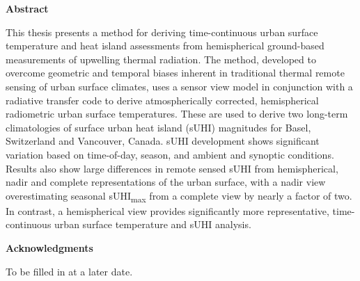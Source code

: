 \pagestyle{plain}
\setcounter{page}{2}

\cleardoublepage %



\begin{center}\textbf{Abstract}\end{center}

This thesis presents a method for deriving time-continuous urban surface temperature and heat island assessments from hemispherical ground-based measurements of upwelling thermal radiation. The method, developed to overcome geometric and temporal biases inherent in traditional thermal remote sensing of urban surface climates, uses a sensor view model in conjunction with a radiative transfer code to derive atmospherically corrected, hemispherical radiometric urban surface temperatures. These are used to derive two long-term climatologies of surface urban heat island (sUHI) magnitudes for Basel, Switzerland and Vancouver, Canada. sUHI development shows significant variation based on time-of-day, season, and ambient and synoptic conditions. Results also show large differences in remote sensed sUHI from hemispherical, nadir and complete representations of the urban surface, with a nadir view overestimating seasonal sUHI\textsubscript{max} from a complete view by nearly a factor of two. In contrast, a hemispherical view provides significantly more representative, time-continuous urban surface temperature and sUHI analysis.

\cleardoublepage


\begin{center}\textbf{Acknowledgments}\end{center}

To be filled in at a later date.
\cleardoublepage

\renewcommand\contentsname{Table of Contents}
\tableofcontents
\cleardoublepage
{}    %

